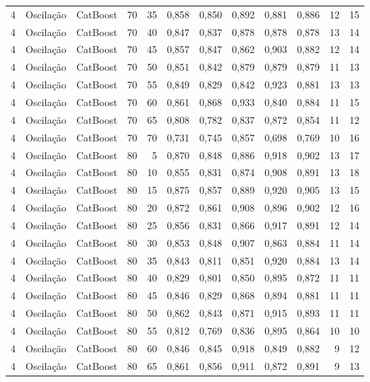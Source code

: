 \begin{longtable}{@{}rllrrrrrrrrr@{}}
4 & Oscilação & CatBoost & 70 & 35 & 0,858 & 0,850 & 0,892 & 0,881 & 0,886 & 12 & 15 \\
4 & Oscilação & CatBoost & 70 & 40 & 0,847 & 0,837 & 0,878 & 0,878 & 0,878 & 13 & 14 \\
4 & Oscilação & CatBoost & 70 & 45 & 0,857 & 0,847 & 0,862 & 0,903 & 0,882 & 12 & 14 \\
4 & Oscilação & CatBoost & 70 & 50 & 0,851 & 0,842 & 0,879 & 0,879 & 0,879 & 11 & 13 \\
4 & Oscilação & CatBoost & 70 & 55 & 0,849 & 0,829 & 0,842 & 0,923 & 0,881 & 13 & 13 \\
4 & Oscilação & CatBoost & 70 & 60 & 0,861 & 0,868 & 0,933 & 0,840 & 0,884 & 11 & 15 \\
4 & Oscilação & CatBoost & 70 & 65 & 0,808 & 0,782 & 0,837 & 0,872 & 0,854 & 11 & 12 \\
4 & Oscilação & CatBoost & 70 & 70 & 0,731 & 0,745 & 0,857 & 0,698 & 0,769 & 10 & 16 \\
4 & Oscilação & CatBoost & 80 & 5 & 0,870 & 0,848 & 0,886 & 0,918 & 0,902 & 13 & 17 \\
4 & Oscilação & CatBoost & 80 & 10 & 0,855 & 0,831 & 0,874 & 0,908 & 0,891 & 13 & 18 \\
4 & Oscilação & CatBoost & 80 & 15 & 0,875 & 0,857 & 0,889 & 0,920 & 0,905 & 13 & 15 \\
4 & Oscilação & CatBoost & 80 & 20 & 0,872 & 0,861 & 0,908 & 0,896 & 0,902 & 12 & 16 \\
4 & Oscilação & CatBoost & 80 & 25 & 0,856 & 0,831 & 0,866 & 0,917 & 0,891 & 12 & 14 \\
4 & Oscilação & CatBoost & 80 & 30 & 0,853 & 0,848 & 0,907 & 0,863 & 0,884 & 11 & 14 \\
4 & Oscilação & CatBoost & 80 & 35 & 0,843 & 0,811 & 0,851 & 0,920 & 0,884 & 13 & 14 \\
4 & Oscilação & CatBoost & 80 & 40 & 0,829 & 0,801 & 0,850 & 0,895 & 0,872 & 11 & 11 \\
4 & Oscilação & CatBoost & 80 & 45 & 0,846 & 0,829 & 0,868 & 0,894 & 0,881 & 11 & 11 \\
4 & Oscilação & CatBoost & 80 & 50 & 0,862 & 0,843 & 0,871 & 0,915 & 0,893 & 11 & 11 \\
4 & Oscilação & CatBoost & 80 & 55 & 0,812 & 0,769 & 0,836 & 0,895 & 0,864 & 10 & 10 \\
4 & Oscilação & CatBoost & 80 & 60 & 0,846 & 0,845 & 0,918 & 0,849 & 0,882 & 9 & 12 \\
4 & Oscilação & CatBoost & 80 & 65 & 0,861 & 0,856 & 0,911 & 0,872 & 0,891 & 9 & 13 \\

\end{longtable}
